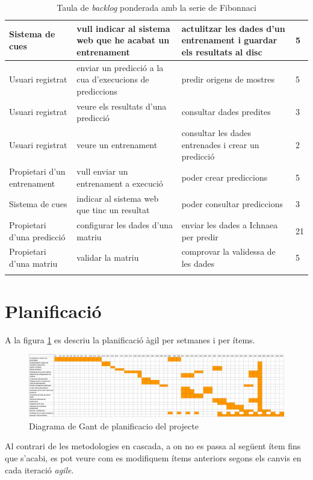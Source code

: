 \begin{center}
\begin{longtable}{ | p{3cm} | p{5cm} | p{5cm} | p{1cm} | }
Sistema de cues & vull indicar al sistema web que he acabat un entrenament & actulitzar les dades d'un entrenament i guardar els resultats al disc & 5 \\ \hline
Usuari registrat & enviar un predicció a la cua d'execucions de prediccions & predir origens de mostres & 5  \\ \hline
Usuari registrat & veure els resultats d'una predicció & consultar dades predites & 3  \\ \hline
Usuari registrat & veure un entrenament & consultar les dades entrenades i crear un predicció & 2  \\ \hline
Propietari d'un entrenament & vull enviar un entrenament a execució & poder crear prediccions & 5  \\ \hline
Sistema de cues & indicar al sistema web que tinc un resultat & poder consultar prediccions & 3  \\ \hline
Propietari d'una predicció & configurar les dades d'una matriu	& enviar les dades a Ichnaea per predir & 21  \\ \hline
Propietari d'una matriu & validar la matriu	 & comprovar la validessa de les dades & 5  \\ \hline
\caption{Taula de \textit{backlog} ponderada amb la serie de Fibonnaci}
\label{table:backlog}
\end{longtable}
\end{center}

\section{Planificació}
A la figura \ref{fig:gant} es descriu la planificació àgil per setmanes i per ítems.\\
\begin{figure}
    \includegraphics[scale=0.5]{img/conclussions/gantz.png}
    \caption{Diagrama de Gant de planificacio del projecte}
    \label{fig:gant}
\end{figure}

Al contrari de les metodologies en cascada, a on no es passa al següent ítem fins que s'acabi, es pot veure com es modifiquem ítems anteriors segons els canvis en cada iteració \textit{agile}.

